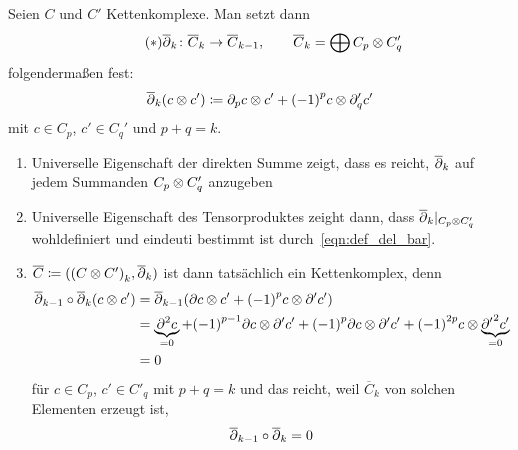 \begin{defn}
  Seien $C$ und $C'$ Kettenkomplexe.
  Man setzt dann
  \begin{equation*}
    \tag{$\ast$}
    \label{eqn:def_del_bar}
    \overline{\partial}_k \colon \overline{C}_k \to \overline{C}_{k-1}, \qquad \overline{C}_k = \bigoplus C_p \otimes C'_q
  \end{equation*}
  folgendermaßen fest:
  \begin{equation*}
    \overline {\partial}_k (c \otimes c') \coloneqq \partial_p c \otimes c' + {(-1)}^p c \otimes \partial_q' c'
  \end{equation*}
  mit $c \in C_p$, $c' \in C_q'$ und $p + q = k$.
\end{defn}

\begin{kommentar}
  \begin{enumerate}
    \item
      Universelle Eigenschaft der direkten Summe zeigt, dass es reicht, $\overline {\partial}_k$ auf jedem Summanden $C_p \otimes C'_q$ anzugeben
    \item
      Universelle Eigenschaft des Tensorproduktes zeight dann, dass $\overline {\partial}_k | _{C_p \otimes C'_q}$ wohldefiniert und eindeuti bestimmt ist durch~\eqref{eqn:def_del_bar}.
    \item
      $\overline C \coloneqq ({(C \otimes C')}_k, \overline {\partial}_k)$ ist dann tatsächlich ein Kettenkomplex, denn
      \begin{align*}
        \overline {\partial}_{k-1} \circ \overline {\partial}_k (c \otimes c')
          & = \overline {\partial}_{k-1} (\partial c \otimes c' + {(-1)}^p c \otimes \partial' c') \\
          & = \underbrace{\partial^2 c}_{= 0} + {(-1)}^{p-1} \partial c \otimes \partial' c'
          + {(-1)}^{p} \partial c \otimes \partial' c' + {(-1)}^{2p} c \otimes \underbrace{{\partial'}^2 c'}_{= 0} \\
          & = 0
      \end{align*}
      für $c \in C_p$, $c' \in C'_q$ mit $p + q = k$ und das reicht, weil $\overline C_k$ von solchen Elementen erzeugt ist,
      \begin{equation*}
        \overline {\partial}_{k-1} \circ \overline {\partial}_k = 0
      \end{equation*}
  \end{enumerate}
\end{kommentar}

